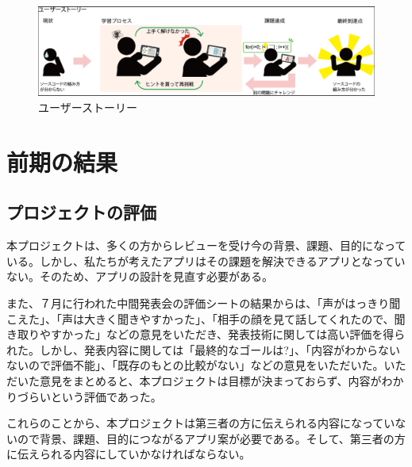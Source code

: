 \documentclass[openany,11pt,papersize]{jsbook}
\begin{document}
\begin{figure}[H]
\begin{center}
\includegraphics[width=14.5cm, bb=0 0 564 129]{img/4thParagraph/userstory.png}
\end{center}
\caption{ユーザーストーリー}
\end{figure}








\chapter{前期の結果}
\section{プロジェクトの評価}
本プロジェクトは、多くの方からレビューを受け今の背景、課題、目的になっている。しかし、私たちが考えたアプリはその課題を解決できるアプリとなっていない。そのため、アプリの設計を見直す必要がある。

また、７月に行われた中間発表会の評価シートの結果からは、「声がはっきり聞こえた」、「声は大きく聞きやすかった」、「相手の顔を見て話してくれたので、聞き取りやすかった」などの意見をいただき、発表技術に関しては高い評価を得られた。しかし、発表内容に関しては「最終的なゴールは?」、「内容がわからないないので評価不能」、「既存のもとの比較がない」などの意見をいただいた。いただいた意見をまとめると、本プロジェクトは目標が決まっておらず、内容がわかりづらいという評価であった。

これらのことから、本プロジェクトは第三者の方に伝えられる内容になっていないので背景、課題、目的につながるアプリ案が必要である。そして、第三者の方に伝えられる内容にしていかなければならない。
\end{document}
